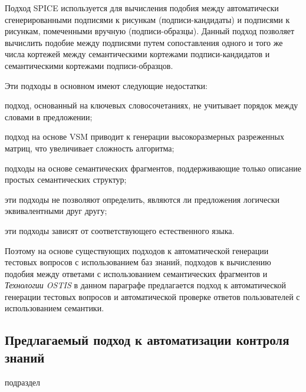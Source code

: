 \begin{textitemize}
	Подход SPICE используется для вычисления подобия между автоматически сгенерированными подписями к рисункам (подписи-кандидаты) и подписями к рисункам, помеченными вручную (подписи-образцы). Данный подход позволяет вычислить подобие между подписями путем сопоставления одного и того же числа кортежей между семантическими кортежами подписи-кандидатов и семантическими кортежами подписи-образцов.
	
\end{textitemize}

Эти подходы в основном имеют следующие недостатки:

\begin{textitemize}
	\item подход, основанный на ключевых словосочетаниях, не учитывает порядок между словами в предложении;
	\item подход на основе VSM приводит к генерации высокоразмерных разреженных матриц, что увеличивает сложность алгоритма;
	\item подходы на основе семантических фрагментов, поддерживающие только описание простых семантических структур;
	\item эти подходы не позволяют определить, являются ли предложения логически эквивалентными друг другу;
	\item эти подходы зависят от соответствующего естественного языка.
\end{textitemize}

Поэтому на основе существующих подходов к автоматической генерации тестовых вопросов с использованием баз знаний, подходов к вычислению подобия между ответами с использованием семантических фрагментов и \textit{Технологии OSTIS} в данном параграфе предлагается подход к автоматической генерации тестовых вопросов и автоматической проверке ответов пользователей с использованием семантики.

\subsection{Предлагаемый подход к автоматизации контроля знаний}
\label{subsec_knowledge_control_automation}

\begin{SCn}
	\begin{scnrelfromlist}{подраздел}
	\end{scnrelfromlist}
\end{SCn}

